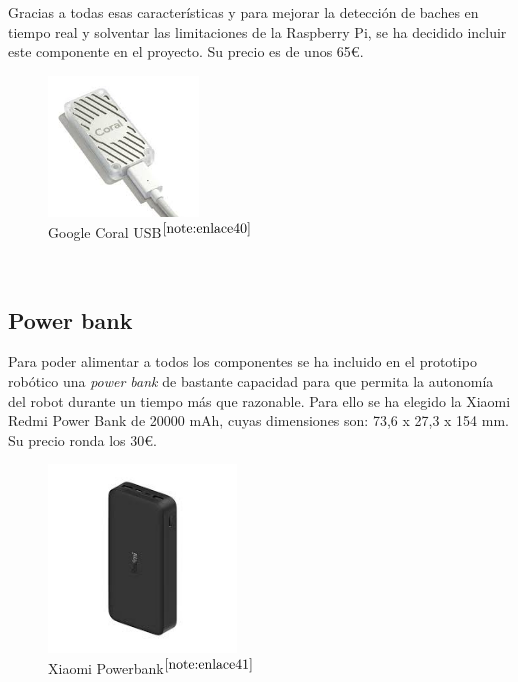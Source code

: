 Gracias a todas esas características y para mejorar la detección de baches en tiempo real y solventar las limitaciones de la Raspberry Pi, se ha decidido incluir este componente en el proyecto. Su precio es de unos 65€.
 
\begin{figure} [h!]
	\begin{center}
		\includegraphics[width=4cm]{figs/googlecoral.png}
	\end{center}
	\caption{Google Coral USB$^{\ref{note:enlace40}}$} 
	\label{fig:googlecoral}
\end{figure}\

\setcounter{footnote}{40} %

\subsection{Power bank}

Para poder alimentar a todos los componentes se ha incluido en el prototipo robótico una \textit{power bank} de bastante capacidad para que permita la autonomía del robot durante un tiempo más que razonable. Para ello se ha elegido la Xiaomi Redmi Power Bank de 20000 mAh, cuyas dimensiones son: 73,6 x 27,3 x 154 mm. Su precio ronda los 30€.

\begin{figure} [h!]
	\begin{center}
		\includegraphics[width=5cm]{figs/powerbank.png}
	\end{center}
	\caption{Xiaomi Powerbank$^{\ref{note:enlace41}}$} 
	\label{fig:powerbank}
\end{figure}\

